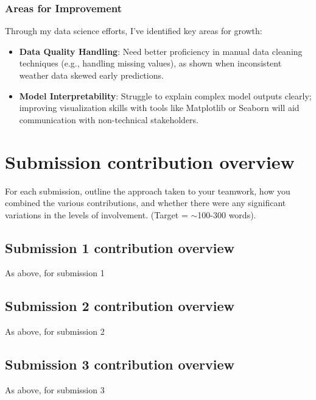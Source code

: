 \documentclass[a4paper, 11pt]{report}
\begin{document}
\subsubsection*{Areas for Improvement}
Through my data science efforts, I’ve identified key areas for growth:
\begin{itemize}
    \item \textbf{Data Quality Handling}: Need better proficiency in manual data cleaning techniques (e.g., handling missing values), as shown when inconsistent weather data skewed early predictions.
    \item \textbf{Model Interpretability}: Struggle to explain complex model outputs clearly; improving visualization skills with tools like Matplotlib or Seaborn will aid communication with non-technical stakeholders.
\end{itemize}


\newpage

\section{Submission contribution overview}

For each submission, outline the approach taken to your teamwork, how you combined the various contributions, and whether there were any significant variations in the levels of involvement. (Target = $\sim$100-300 words).

\subsection{Submission 1 contribution overview}

As above, for submission 1

\subsection{Submission 2 contribution overview}

As above, for submission 2

\subsection{Submission 3 contribution overview}

As above, for submission 3



\newpage



\end{document}
